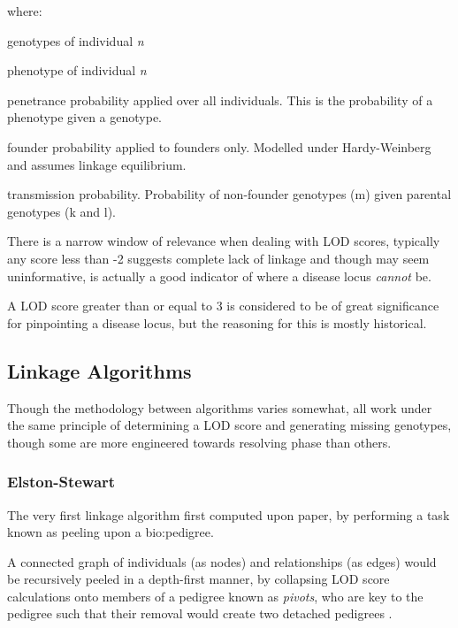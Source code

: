 where:
\begin{spacing}{1}
\begin{description}[labelsep=2em, align=right, labelwidth=3em, labelindent=4em, leftmargin=*]
\item[\(g_n\)]{genotypes of individual \textit{n}}
\item[\(Y_n\)]{phenotype of individual \textit{n}}
\item[\(P(Y_i|g_i)\)]{penetrance probability applied over all individuals. This is the probability of a phenotype given a genotype.}
\item[\(P(g_j)\)]{founder probability applied to founders only. Modelled under Hardy-Weinberg and assumes linkage equilibrium.}
\item[\(P(g_m|g_k,g_l)\)]{transmission probability. Probability of non-founder genotypes (m) given parental genotypes (k and l).}
\end{description}
\end{spacing}


There is a narrow window of relevance when dealing with LOD scores, typically any score less than -2 suggests complete lack of linkage and though may seem uninformative, is actually a good indicator of where a disease locus \textit{cannot} be.

A LOD score greater than or equal to 3 is considered to be of great significance for pinpointing a disease locus, but the reasoning for this is mostly historical.

\subsection{Linkage Algorithms}

Though the methodology between algorithms varies somewhat, all work under the same principle of determining a LOD score and generating missing genotypes, though some are more engineered towards resolving phase than others.

\subsubsection{Elston-Stewart}\label{ref:back:els}

The very first linkage algorithm first computed upon paper, by performing a task known as peeling upon a \gls{bio:pedigree}.

A connected graph of individuals (as nodes) and relationships (as edges) would be recursively peeled in a depth-first manner, by collapsing LOD score calculations onto members of a pedigree known as \textit{pivots}, who are key to the pedigree such that their removal would create two detached pedigrees \cite{elston}. 

